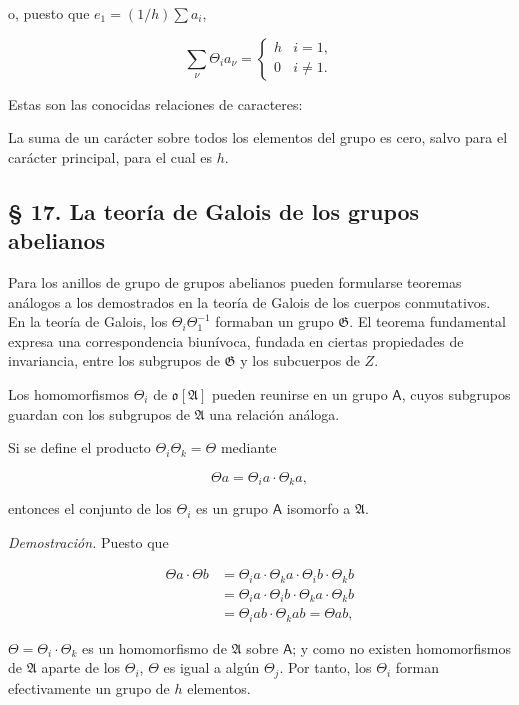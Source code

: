 o, puesto que \(e_1 = (1/h) \sum a_i\),

\[
\sum_\nu \Theta_i a_\nu=\begin{cases} h & i=1,\\ 0 & i\ne 1. \end{cases}
\]

Estas son las conocidas relaciones de caracteres:

La suma de un carácter sobre todos los elementos del grupo es cero, salvo para el carácter principal, para el cual es \(h\).

\subsection*{§ 17. La teoría de Galois de los grupos abelianos}\label{la-teoria-de-galois-de-los-grupos-abelianos}

Para los anillos de grupo de grupos abelianos pueden formularse teoremas análogos a los demostrados en la teoría de Galois de los cuerpos conmutativos. En la teoría de Galois, los \(\Theta_i\Theta_1^{-1}\) formaban un grupo \(\mathfrak G\). El teorema fundamental expresa una correspondencia biunívoca, fundada en ciertas propiedades de invariancia, entre los subgrupos de \(\mathfrak G\) y los subcuerpos de \(Z\).

Los homomorfismos \(\Theta_i\) de \(\mathfrak o[\mathfrak A]\) pueden reunirse en un grupo \(\mathsf A\), cuyos subgrupos guardan con los subgrupos de \(\mathfrak A\) una relación análoga.

Si se define el producto \(\Theta_i \Theta_k = \Theta\) mediante

\[\Theta a = \Theta_i a \cdot \Theta_k a,\]

entonces el conjunto de los \(\Theta_i\) es un grupo \(\mathsf A\) isomorfo a \(\mathfrak A\).

\emph{Demostración.} Puesto que

\[\begin{aligned}
\Theta a \cdot \Theta b &= \Theta_i a \cdot \Theta_k a \cdot \Theta_i b \cdot \Theta_k b \\
&= \Theta_i a \cdot \Theta_i b \cdot \Theta_k a \cdot \Theta_k b \\
&= \Theta_i a b \cdot \Theta_k a b = \Theta a b,
\end{aligned}\]

\(\Theta=\Theta_i\cdot\Theta_k\) es un homomorfismo de \(\mathfrak A\) sobre \(\mathsf A\); y como no existen homomorfismos de \(\mathfrak A\) aparte de los \(\Theta_i\), \(\Theta\) es igual a algún \(\Theta_j\). Por tanto, los \(\Theta_i\) forman efectivamente un grupo de \(h\) elementos.

